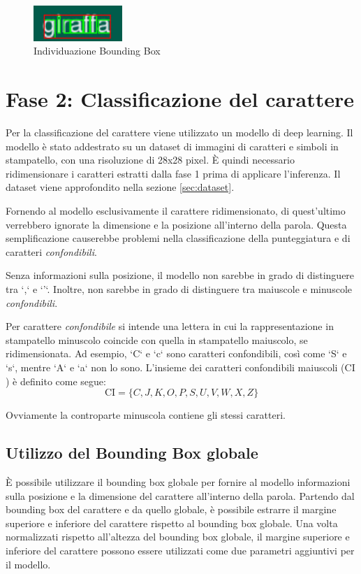 \begin{figure}[H]
	\centering
	\includegraphics[width=0.3\textwidth]{images/giraffa-bb.jpeg}
	\caption{Individuazione Bounding Box}
	\label{fig:screenshot}
\end{figure}

\section{Fase 2: Classificazione del carattere}

Per la classificazione del carattere viene utilizzato un modello di deep learning. Il modello è stato addestrato su un dataset di immagini di caratteri e simboli in stampatello, con una risoluzione di 28x28 pixel. È quindi necessario ridimensionare i caratteri estratti dalla fase 1 prima di applicare l'inferenza. Il dataset viene approfondito nella sezione \ref{sec:dataset}.

Fornendo al modello esclusivamente il carattere ridimensionato, di quest'ultimo verrebbero ignorate la dimensione e la posizione all'interno della parola. Questa semplificazione causerebbe problemi nella classificazione della punteggiatura e di caratteri \emph{confondibili}.

Senza informazioni sulla posizione, il modello non sarebbe in grado di distinguere tra `,` e `'`. Inoltre, non sarebbe in grado di distinguere tra maiuscole e minuscole \emph{confondibili}.
\newline

Per carattere \emph{confondibile} si intende una lettera in cui la rappresentazione in stampatello minuscolo coincide con quella in stampatello maiuscolo, se ridimensionata. Ad esempio, `C` e `c` sono caratteri confondibili, così come `S` e `s`, mentre `A` e `a` non lo sono.
L'insieme dei caratteri confondibili maiuscoli ($\text{CI}$) è definito come segue:
$$\text{CI} = \{C, J, K, O, P, S, U, V, W, X, Z\}$$

Ovviamente la controparte minuscola contiene gli stessi caratteri.

\subsection{Utilizzo del Bounding Box globale}

È possibile utilizzare il bounding box globale per fornire al modello informazioni sulla posizione e la dimensione del carattere all'interno della parola. Partendo dal bounding box del carattere e da quello globale, è possibile estrarre il margine superiore e inferiore del carattere rispetto al bounding box globale. Una volta normalizzati rispetto all'altezza del bounding box globale, il margine superiore e inferiore del carattere possono essere utilizzati come due parametri aggiuntivi per il modello.


